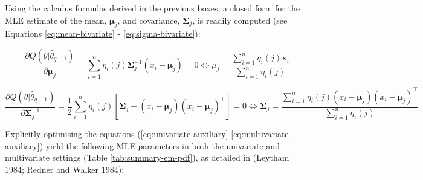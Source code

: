 Using the calculus formulas derived in the previous boxes, a closed form for the MLE estimate of the mean, \(\boldsymbol{\mu}_j\), and covariance, \(\boldsymbol{\Sigma}_j\), is readily computed (see Equations \eqref{eq:mean-bivariate} - \eqref{eq:sigma-bivariate}):

\begin{equation}
\frac{\partial Q(\theta|\hat{\theta}_{q-1})}{\partial \boldsymbol{\mu}_j} =
\sum_{i=1}^n \eta_i(j) \boldsymbol{\Sigma}_j^{-1}(x_i - \boldsymbol{\mu}_j) =0
\Leftrightarrow
  \mu_j = \frac{\sum_{i=1}^n \eta_i(j) \boldsymbol{x}_i}{\sum_{i=1}^n \eta_i(j)}
\label{eq:mean-bivariate}
\end{equation}

\begin{equation}
 \frac{\partial Q(\theta|\hat{\theta}_{q-1})}{\partial \boldsymbol{\Sigma}_j^{-1}}=\frac{1}{2} \sum_{i=1}^n \eta_i(j) \left[ \boldsymbol{\Sigma}_j  - (x_i - \boldsymbol{\mu}_j)(x_i - \boldsymbol{\mu}_j)^\top \right]= 0
\Leftrightarrow
  \boldsymbol{\Sigma}_j = \frac{\sum_{i=1}^n \eta_i(j) (x_i - \boldsymbol{\mu}_j)(x_i - \boldsymbol{\mu}_j)^\top }{\sum_{i=1}^n \eta_i(j)}
\label{eq:sigma-bivariate}
\end{equation}

Explicitly optimising the equations (\eqref{eq:univariate-auxiliary}-\eqref{eq:multivariate-auxiliary}) yield the following MLE parameters in both the univariate and multivariate settings (Table \ref{tab:summary-em-pdf}), as detailed in (Leytham 1984; Redner and Walker 1984):

